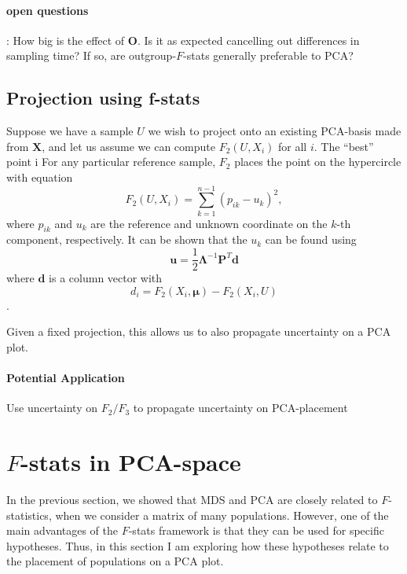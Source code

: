 \documentclass[10pt,a4paper]{article}
\newcommand{\MX}{\mathbf{X}} %
\newcommand{\MF}{\mathbf{F}_2} %
\newcommand{\MFT}{\mathbf{F}_3} %
\newcommand{\MP}{\mathbf{P}} %
\newcommand{\MEIGEN}{\mathbf{\Lambda}} %
\newcommand{\MEAN}{\boldsymbol{\mu}} %
\begin{document}
\paragraph{open questions}: How big is the effect of $\mathbf{O}$. Is it as expected cancelling out differences in sampling time? If so, are outgroup-$F$-stats generally preferable to PCA?





\subsection{Projection using f-stats}
Suppose we have a sample $U$ we wish to project onto an existing PCA-basis made from $\MX$, and let us assume we can compute $F_2(U, X_i)$ for all $i$. The ``best'' point i
For any particular reference sample, $F_2$ places the point on the hypercircle with equation
\begin{equation}
F_2(U, X_i) = \sum_{k=1}^{n-1} (p_{ik} - u_k)^2,
\end{equation}
where $p_{ik}$ and $u_k$ are the reference and unknown coordinate on the $k$-th component, respectively. It can be shown \cite{gower1968} that the $u_k$ can be found using
\begin{equation}
\mathbf{u} = \frac{1}{2}\MEIGEN^{-1}\MP^T\mathbf{d}
\end{equation}
where $\mathbf{d}$ is a column vector with $$d_i = F_2(X_i, \MEAN) - F_2(X_i, U)$$.

Given a fixed projection, this allows us to also propagate uncertainty on a PCA plot.

\paragraph{Potential Application} Use uncertainty on $F_2/F_3$ to propagate uncertainty on PCA-placement


\section{$F$-stats in PCA-space}
In the previous section, we showed that MDS and PCA are closely related to $F$-statistics, when we consider a matrix of many populations. However, one of the main advantages of the $F$-stats framework is that they can be used for specific hypotheses. Thus, in this section I am exploring how these hypotheses relate to the placement of populations on a PCA plot.
\end{document}
